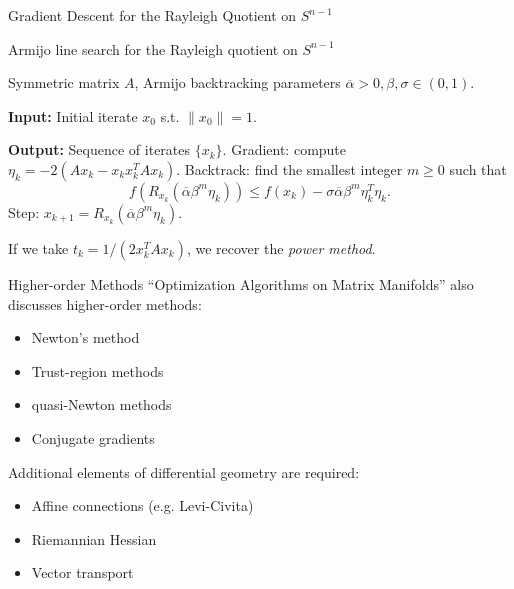 \documentclass[xcolor=dvipsnames,t]{beamer} %
\begin{document}
\begin{frame}{Gradient Descent for the Rayleigh Quotient on $S^{n-1}$}
   
   \begin{algorithm}[H]
      \caption{Armijo line search for the Rayleigh quotient on $S^{n-1}$}
      \begin{algorithmic}[1] %
         \Require Symmetric matrix $A$, Armijo backtracking parameters $\overline{\alpha}>0,\beta,\sigma\in(0,1)$.
         \item[\textbf{Input:}] Initial iterate $x_0$ s.t. $\|x_0\|=1$. %
         \item[\textbf{Output:}] Sequence of iterates $\{x_k\}$.
            \State Gradient: compute ${\eta_k = -2(Ax_k-x_kx_k^TAx_k)}.$
            \State Backtrack: find the smallest integer $m\ge 0$ such that
            \[ f(R_{x_k}(\overline{\alpha}\beta^m\eta_k))\le f(x_k) - \sigma\overline{\alpha}\beta^m\eta_k^T\eta_k. \] 
            \State Step: $x_{k+1}=R_{x_k}(\overline{\alpha}\beta^m\eta_k)$.
         \EndFor
      \end{algorithmic}
   \end{algorithm}
   
   If we take $t_k = 1/(2x_k^TAx_k)$, we recover the \emph{power method}.

\end{frame}


\begin{frame}{Higher-order Methods}
   ``Optimization Algorithms on Matrix Manifolds'' also discusses higher-order methods:
   \begin{itemize}
      \item Newton's method
      \item Trust-region methods
      \item quasi-Newton methods
      \item Conjugate gradients\\[1em]
   \end{itemize}

   Additional elements of differential geometry are required:
   \begin{itemize}
      \item Affine connections (e.g. Levi-Civita)
      \item Riemannian Hessian
      \item Vector transport
   \end{itemize}

\end{frame}
\end{document}
